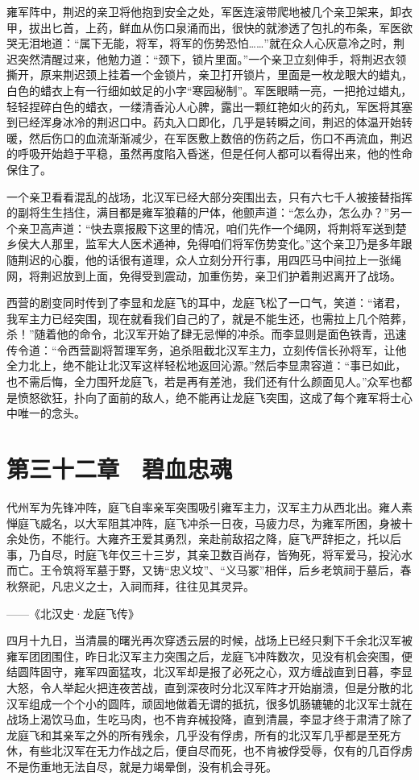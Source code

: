 雍军阵中，荆迟的亲卫将他抱到安全之处，军医连滚带爬地被几个亲卫架来，卸衣甲，拔出匕首，上药，鲜血从伤口泉涌而出，很快的就渗透了包扎的布条，军医欲哭无泪地道：“属下无能，将军，将军的伤势恐怕……”就在众人心灰意冷之时，荆迟突然清醒过来，他勉力道：“颈下，锁片里面。”一个亲卫立刻伸手，将荆迟衣领撕开，原来荆迟颈上挂着一个金锁片，亲卫打开锁片，里面是一枚龙眼大的蜡丸，白色的蜡衣上有一行细如蚊足的小字“寒园秘制”。军医眼睛一亮，一把抢过蜡丸，轻轻捏碎白色的蜡衣，一缕清香沁人心脾，露出一颗红艳如火的药丸，军医将其塞到已经浑身冰冷的荆迟口中。药丸入口即化，几乎是转瞬之间，荆迟的体温开始转暖，然后伤口的血流渐渐减少，在军医敷上数倍的伤药之后，伤口不再流血，荆迟的呼吸开始趋于平稳，虽然再度陷入昏迷，但是任何人都可以看得出来，他的性命保住了。

一个亲卫看看混乱的战场，北汉军已经大部分突围出去，只有六七千人被接替指挥的副将生生挡住，满目都是雍军狼藉的尸体，他颤声道：“怎么办，怎么办？”另一个亲卫高声道：“快去禀报殿下这里的情况，咱们先作一个绳网，将荆将军送到楚乡侯大人那里，监军大人医术通神，免得咱们将军伤势变化。”这个亲卫乃是多年跟随荆迟的心腹，他的话很有道理，众人立刻分开行事，用四匹马中间拉上一张绳网，将荆迟放到上面，免得受到震动，加重伤势，亲卫们护着荆迟离开了战场。

西营的剧变同时传到了李显和龙庭飞的耳中，龙庭飞松了一口气，笑道：“诸君，我军主力已经突围，现在就看我们自己的了，就是不能生还，也需拉上几个陪葬，杀！”随着他的命令，北汉军开始了肆无忌惮的冲杀。而李显则是面色铁青，迅速传令道：“令西营副将暂理军务，追杀阻截北汉军主力，立刻传信长孙将军，让他全力北上，绝不能让北汉军这样轻松地返回沁源。”然后李显肃容道：“事已如此，也不需后悔，全力围歼龙庭飞，若是再有差池，我们还有什么颜面见人。”众军也都是愤怒欲狂，扑向了面前的敌人，绝不能再让龙庭飞突围，这成了每个雍军将士心中唯一的念头。

\chapter{第三十二章　碧血忠魂}

代州军为先锋冲阵，庭飞自率亲军突围吸引雍军主力，汉军主力从西北出。雍人素惮庭飞威名，以大军阻其冲阵，庭飞冲杀一日夜，马疲力尽，为雍军所困，身被十余处伤，不能行。大雍齐王爱其勇烈，亲赴前敌招之降，庭飞严辞拒之，托以后事，乃自尽，时庭飞年仅三十三岁，其亲卫数百尚存，皆殉死，将军爱马，投沁水而亡。王令筑将军墓于野，又铸“忠义坟”、“义马冢”相伴，后乡老筑祠于墓后，春秋祭祀，凡忠义之士，入祠而拜，往往见其灵异。

——《北汉史·龙庭飞传》

四月十九日，当清晨的曙光再次穿透云层的时候，战场上已经只剩下千余北汉军被雍军团团围住，昨日北汉军主力突围之后，龙庭飞冲阵数次，见没有机会突围，便结圆阵固守，雍军四面猛攻，北汉军却是报了必死之心，双方缠战直到日暮，李显大怒，令人举起火把连夜苦战，直到深夜时分北汉军阵才开始崩溃，但是分散的北汉军组成一个个小的圆阵，顽固地做着无谓的抵抗，很多饥肠辘辘的北汉军士就在战场上渴饮马血，生吃马肉，也不肯弃械投降，直到清晨，李显才终于肃清了除了龙庭飞和其亲军之外的所有残余，几乎没有俘虏，所有的北汉军几乎都是至死方休，有些北汉军在无力作战之后，便自尽而死，也不肯被俘受辱，仅有的几百俘虏不是伤重地无法自尽，就是力竭晕倒，没有机会寻死。

